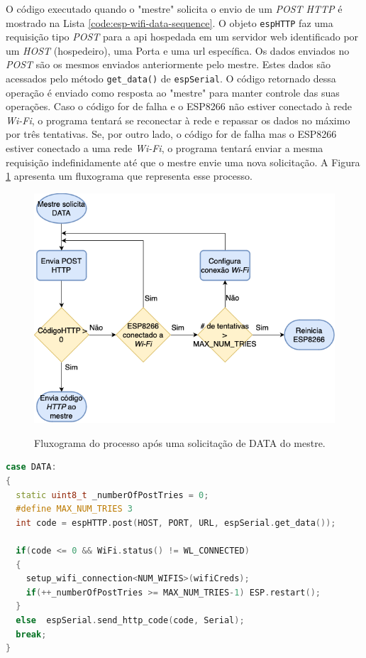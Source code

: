 O código executado quando o "mestre" solicita o envio de um \textit{POST HTTP} é mostrado na Lista \ref*{code:esp-wifi-data-sequence}. O objeto \texttt{espHTTP} faz uma requisição tipo \textit{POST} para a \acrshort{api} hospedada em um servidor web identificado por um \textit{HOST} (hospedeiro), uma Porta e uma \acrshort{url} específica. Os dados enviados no \textit{POST} são os mesmos enviados anteriormente pelo mestre. Estes dados são acessados pelo método \texttt{get\_data()} de \texttt{espSerial}. O código retornado dessa operação é enviado como resposta ao "mestre" para manter controle das suas operações. Caso o código for de falha e o ESP8266 não estiver conectado à rede \textit{Wi-Fi}, o programa tentará se reconectar à rede e repassar os dados no máximo por três tentativas. Se, por outro lado, o código for de falha mas o ESP8266 estiver conectado a uma rede \textit{Wi-Fi}, o programa tentará enviar a mesma requisição indefinidamente até que o mestre envie uma nova solicitação. A Figura \ref*{fig:fw-esp-data-sequence} apresenta um fluxograma que representa esse processo. 

\begin{figure}[h]
    \centering
    \caption{Fluxograma do processo após uma solicitação de DATA do mestre.}
    \includegraphics[width=0.75\linewidth]{aftertext//Firmware ESP8266/Figuras/ESP8266 DATA sequence (PT).png}
    \label{fig:fw-esp-data-sequence}
\end{figure}

\begin{lstlisting}[language=C++, caption=Sequencia de operações no comando DATA]
case DATA:
{
  static uint8_t _numberOfPostTries = 0;
  #define MAX_NUM_TRIES 3
  int code = espHTTP.post(HOST, PORT, URL, espSerial.get_data());
        
  if(code <= 0 && WiFi.status() != WL_CONNECTED)
  {
    setup_wifi_connection<NUM_WIFIS>(wifiCreds);
    if(++_numberOfPostTries >= MAX_NUM_TRIES-1) ESP.restart();
  }
  else  espSerial.send_http_code(code, Serial);
  break;
}
\end{lstlisting}
\label{code:esp-wifi-data-sequence}

